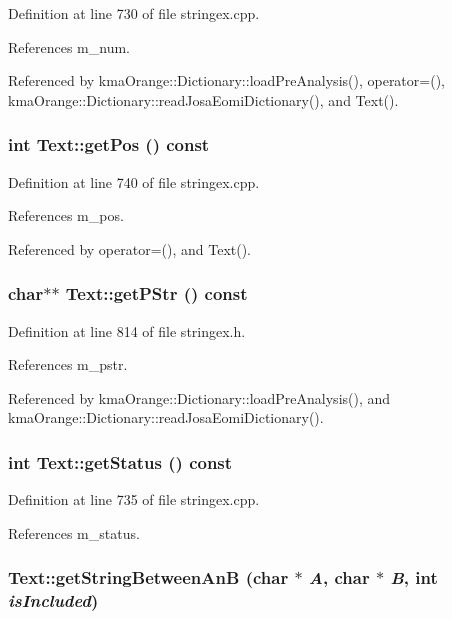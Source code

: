 Definition at line 730 of file stringex.cpp.

References m\_\-num.

Referenced by kmaOrange::Dictionary::loadPreAnalysis(), operator=(), kmaOrange::Dictionary::readJosaEomiDictionary(), and Text().\hypertarget{classText_c9e2de51189a6f09f2cbd70c240dd112}{
\subsubsection[{getPos}]{\setlength{\rightskip}{0pt plus 5cm}int Text::getPos () const}}
\label{classText_c9e2de51189a6f09f2cbd70c240dd112}




Definition at line 740 of file stringex.cpp.

References m\_\-pos.

Referenced by operator=(), and Text().\hypertarget{classText_a5ccfe846fc0a6976000feebc3775db9}{
\subsubsection[{getPStr}]{\setlength{\rightskip}{0pt plus 5cm}char$\ast$$\ast$ Text::getPStr () const}}
\label{classText_a5ccfe846fc0a6976000feebc3775db9}




Definition at line 814 of file stringex.h.

References m\_\-pstr.

Referenced by kmaOrange::Dictionary::loadPreAnalysis(), and kmaOrange::Dictionary::readJosaEomiDictionary().\hypertarget{classText_32420d62ad10114b5cb5bdff866ee48d}{
\subsubsection[{getStatus}]{\setlength{\rightskip}{0pt plus 5cm}int Text::getStatus () const}}
\label{classText_32420d62ad10114b5cb5bdff866ee48d}




Definition at line 735 of file stringex.cpp.

References m\_\-status.\hypertarget{classText_b23de14f2e2378e8c3c6c73d9ae28eef}{
\subsubsection[{getStringBetweenAnB}]{ Text::getStringBetweenAnB (char $\ast$ {\em A}, \/  char $\ast$ {\em B}, \/  int {\em isIncluded})}}
\label{classText_b23de14f2e2378e8c3c6c73d9ae28eef}




